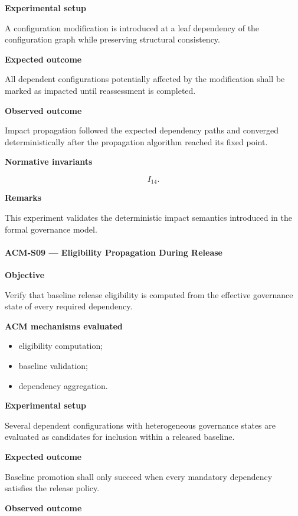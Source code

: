 \documentclass[10pt]{article}
\begin{document}
\textbf{Experimental setup}

A configuration modification is introduced at a leaf dependency of the
configuration graph while preserving structural consistency.

\textbf{Expected outcome}

All dependent configurations potentially affected by the modification shall be
marked as impacted until reassessment is completed.

\textbf{Observed outcome}

Impact propagation followed the expected dependency paths and converged
deterministically after the propagation algorithm reached its fixed point.

\textbf{Normative invariants}

\[
I_{14}.
\]

\textbf{Remarks}

This experiment validates the deterministic impact semantics introduced in the
formal governance model.

\paragraph{ACM-S09 --- Eligibility Propagation During Release}

\textbf{Objective}

Verify that baseline release eligibility is computed from the effective
governance state of every required dependency.

\textbf{ACM mechanisms evaluated}

\begin{itemize}
    \item eligibility computation;
    \item baseline validation;
    \item dependency aggregation.
\end{itemize}

\textbf{Experimental setup}

Several dependent configurations with heterogeneous governance states are
evaluated as candidates for inclusion within a released baseline.

\textbf{Expected outcome}

Baseline promotion shall only succeed when every mandatory dependency satisfies
the release policy.

\textbf{Observed outcome}
\end{document}
